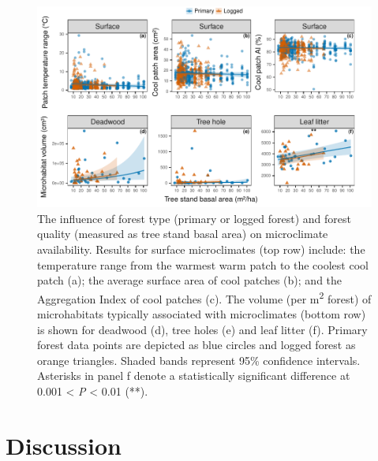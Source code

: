 \documentclass[12pt,a4paper,]{report}
\theoremstyle{definition}
\theoremstyle{definition}
\theoremstyle{definition}
\theoremstyle{remark}
\begin{document}
\begin{figure}

{\centering \includegraphics{./output/fig-4-5-1} 

}

\caption{The influence of forest type (primary or logged forest)
and forest quality (measured as tree stand basal area) on microclimate
availability. Results for surface microclimates (top row) include: the
temperature range from the warmest warm patch to the coolest cool patch
(a); the average surface area of cool patches (b); and the Aggregation
Index of cool patches (c). The volume (per m\textsuperscript{2} forest)
of microhabitats typically associated with microclimates (bottom row) is
shown for deadwood (d), tree holes (e) and leaf litter (f). Primary
forest data points are depicted as blue circles and logged forest as
orange triangles. Shaded bands represent 95\% confidence intervals.
Asterisks in panel f denote a statistically significant difference at
0.001 \textless{} \emph{P} \textless{} 0.01 (**).}\label{fig:fig-4-5}
\end{figure}














\section{Discussion}\label{discussion-2}
\end{document}
